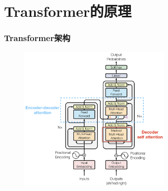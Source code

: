 \documentclass[10pt,t,handout]{beamer}
\begin{document}
\section{Transformer的原理}  
\begin{frame}
\frametitle{Transformer架构}
\begin{figure}
	\centering
	\includegraphics[width=7.5cm]{transformer架构.png}
\end{figure}
\end{frame}
\end{document}
